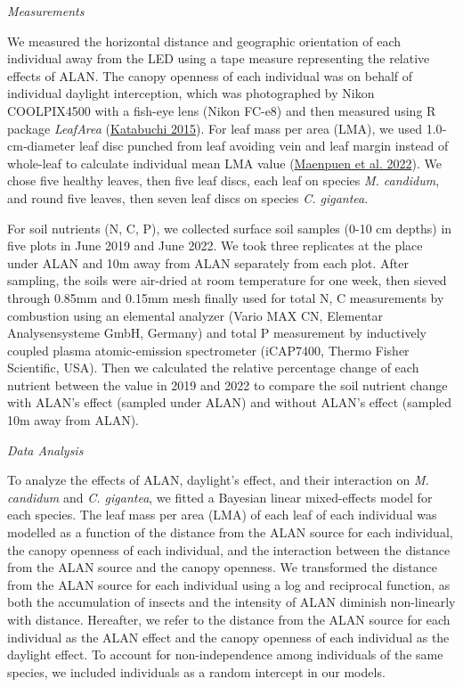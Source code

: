 \documentclass[
  12pt,
  letterpaper,
  DIV=11,
  numbers=noendperiod]{scrartcl}
\begin{document}
\emph{Measurements}

We measured the horizontal distance and geographic orientation of each
individual away from the LED using a tape measure representing the
relative effects of ALAN. The canopy openness of each individual was on
behalf of individual daylight interception, which was photographed by
Nikon COOLPIX4500 with a fish-eye lens (Nikon FC-e8) and then measured
using R package \emph{LeafArea}
(\protect\hyperlink{ref-Katabuchi2015}{Katabuchi 2015}). For leaf mass
per area (LMA), we used 1.0‐cm‐diameter leaf disc punched from leaf
avoiding vein and leaf margin instead of whole-leaf to calculate
individual mean LMA value (\protect\hyperlink{ref-Maenpuen2022}{Maenpuen
et al. 2022}). We chose five healthy leaves, then five leaf discs, each
leaf on species \emph{M. candidum}, and round five leaves, then seven
leaf discs on species \emph{C. gigantea}.

For soil nutrients (N, C, P), we collected surface soil samples (0-10 cm
depths) in five plots in June 2019 and June 2022. We took three
replicates at the place under ALAN and 10m away from ALAN separately
from each plot. After sampling, the soils were air-dried at room
temperature for one week, then sieved through 0.85mm and 0.15mm mesh
finally used for total N, C measurements by combustion using an
elemental analyzer (Vario MAX CN, Elementar Analysensysteme GmbH,
Germany) and total P measurement by inductively coupled plasma
atomic-emission spectrometer (iCAP7400, Thermo Fisher Scientific, USA).
Then we calculated the relative percentage change of each nutrient
between the value in 2019 and 2022 to compare the soil nutrient change
with ALAN's effect (sampled under ALAN) and without ALAN's effect
(sampled 10m away from ALAN).

\emph{Data Analysis}

To analyze the effects of ALAN, daylight's effect, and their interaction
on \emph{M. candidum} and \emph{C. gigantea}, we fitted a Bayesian
linear mixed-effects model for each species. The leaf mass per area
(LMA) of each leaf of each individual was modelled as a function of the
distance from the ALAN source for each individual, the canopy openness
of each individual, and the interaction between the distance from the
ALAN source and the canopy openness. We transformed the distance from
the ALAN source for each individual using a log and reciprocal function,
as both the accumulation of insects and the intensity of ALAN diminish
non-linearly with distance. Hereafter, we refer to the distance from the
ALAN source for each individual as the ALAN effect and the canopy
openness of each individual as the daylight effect. To account for
non-independence among individuals of the same species, we included
individuals as a random intercept in our models.
\end{document}
